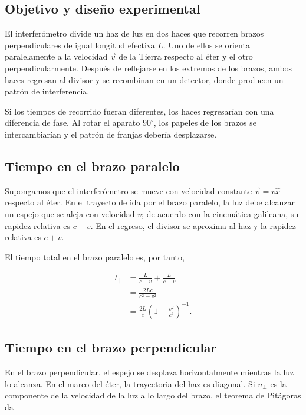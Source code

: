 \subsection{Objetivo y diseño experimental}

El interferómetro divide un haz de luz en dos haces que recorren brazos perpendiculares de igual longitud efectiva $L$. Uno de ellos se orienta paralelamente a la velocidad $\vec{v}$ de la Tierra respecto al éter y el otro perpendicularmente. Después de reflejarse en los extremos de los brazos, ambos haces regresan al divisor y se recombinan en un detector, donde producen un patrón de interferencia.



Si los tiempos de recorrido fueran diferentes, los haces regresarían con una diferencia de fase. Al rotar el aparato $90^\circ$, los papeles de los brazos se intercambiarían y el patrón de franjas debería desplazarse.



\subsection{Tiempo en el brazo paralelo}

Supongamos que el interferómetro se mueve con velocidad constante $\vec{v}=v\hat{x}$ respecto al éter. En el trayecto de ida por el brazo paralelo, la luz debe alcanzar un espejo que se aleja con velocidad $v$; de acuerdo con la cinemática galileana, su rapidez relativa es $c-v$. En el regreso, el divisor se aproxima al haz y la rapidez relativa es $c+v$.

El tiempo total en el brazo paralelo es, por tanto,

\begin{align*}
    t_{\parallel}
    &=\frac{L}{c-v}+\frac{L}{c+v} \\
    &=\frac{2Lc}{c^2-v^2} \\
    &=\frac{2L}{c}
      \left(1-\frac{v^2}{c^2}\right)^{-1}.
\end{align*}

\subsection{Tiempo en el brazo perpendicular}

En el brazo perpendicular, el espejo se desplaza horizontalmente mientras la luz lo alcanza. En el marco del éter, la trayectoria del haz es diagonal. Si $u_{\perp}$ es la componente de la velocidad de la luz a lo largo del brazo, el teorema de Pitágoras da

